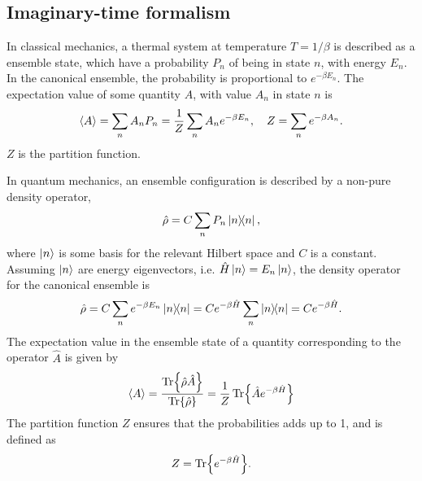 \subsection*{Imaginary-time formalism}
\label{imaginary-time formalism}
In classical mechanics, a thermal system at temperature $T = 1 / \beta$ is described as a ensemble state, which have a probability $P_n$ of being in state $n$, with energy $E_n$.
In the canonical ensemble, the probability is proportional to $e^{-\beta E_n}$.
The expectation value of some quantity $A$, with value $A_n$ in state $n$ is
\begin{equation*}
    \ex{A} 
    = \sum_n A_n P_n = \frac{1}{Z} \sum_n A_n e^{- \beta E_n}, \quad 
    Z  = \sum_n e^{-\beta A_n}.
\end{equation*}
$Z$ is the partition function.

In quantum mechanics, an ensemble configuration is described by a non-pure density operator,
\begin{equation*}
    \hat \rho = C \sum_n P_n \ketbra{n}{n},
\end{equation*}
where $\ket{n}$ is some basis for the relevant Hilbert space and $C$ is a constant. Assuming $\ket{n}$ are energy eigenvectors, i.e. $\hat H \ket{n} = E_n \ket{n}$, the density operator for the canonical ensemble is
\begin{equation*}
    \hat \rho 
    = C \sum_n e^{-\beta E_n} \ketbra{n}{n} 
    = C e^{-\beta \hat H} \sum_n \ketbra{n}{n} 
    = C e^{-\beta \hat H}.
\end{equation*}
The expectation value in the ensemble state of a quantity corresponding to the operator $\hat A$ is given by
\begin{align}
    \ex{A} = \frac{ \Tr{\hat \rho \hat A} }{\Tr{\hat \rho }}
    = \frac{1}{Z} \Tr{\hat A e^{-\beta \hat H}}
\end{align}
The partition function $Z$ ensures that the probabilities adds up to 1, and is defined as
\begin{equation}
    Z = \Tr{e^{-\beta \hat H}}.
\end{equation}

